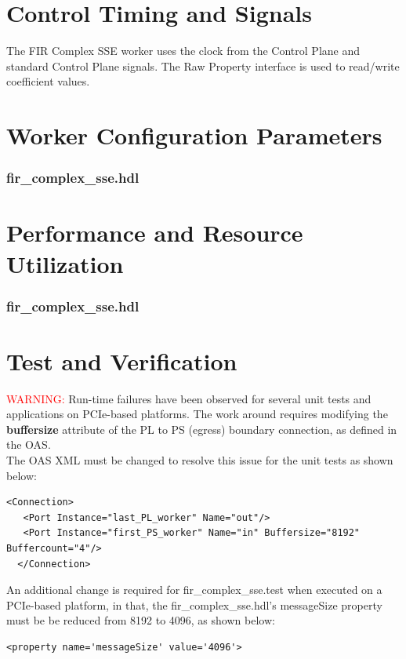 \documentclass{article}
\def\comp{fir\_complex\_sse}
\edef\ecomp{fir_complex_sse}
\begin{document}
\section*{Control Timing and Signals}
\begin{flushleft}
	The FIR Complex SSE worker uses the clock from the Control Plane and standard Control Plane signals. The Raw Property interface is used to read/write coefficient values.
\end{flushleft}

\begin{landscape}
\section*{Worker Configuration Parameters}
\subsubsection*{\comp.hdl}

\section*{Performance and Resource Utilization}
\subsubsection*{\comp.hdl}

\end{landscape}
\section*{Test and Verification}

\noindent\textcolor{red}{WARNING:}
Run-time failures have been observed for several unit tests and applications on PCIe-based platforms. The work around requires modifying the \textbf{buffersize} attribute of the PL to PS (egress) boundary connection, as defined in the OAS. \\
The OAS XML must be changed to resolve this issue for the unit tests as shown below:\\
\begin{lstlisting}[showspaces=false]
  <Connection>
   <Port Instance="last_PL_worker" Name="out"/>
   <Port Instance="first_PS_worker" Name="in" Buffersize="8192" Buffercount="4"/>
  </Connection>
\end{lstlisting}

\noindent An additional change is required for fir\_complex\_sse.test when executed on a PCIe-based platform, in that, the fir\_complex\_sse.hdl's messageSize property must be be reduced from 8192 to 4096, as shown below:\\
\begin{lstlisting}[showspaces=false]
  <property name='messageSize' value='4096'>
\end{lstlisting}
\end{document}

